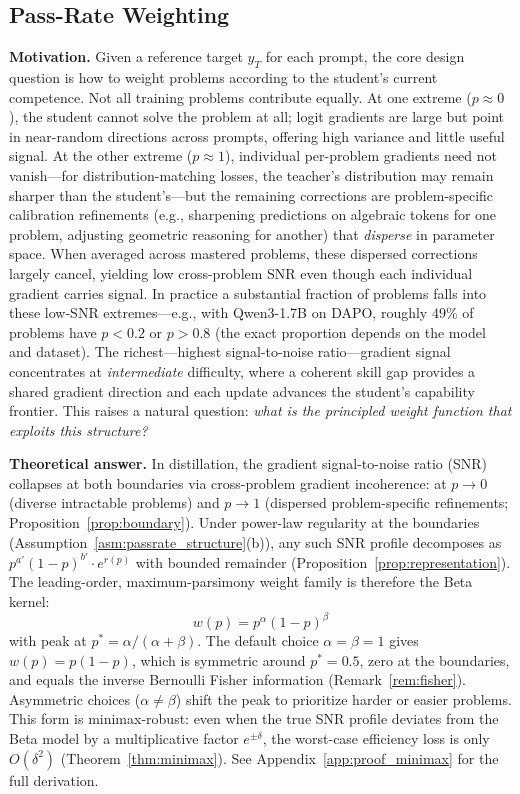 \documentclass{article}
\begin{document}
\subsection{Pass-Rate Weighting}
\label{sec:filtering}

\textbf{Motivation.} Given a reference target $y_T$ for each prompt, the core design question is how to weight problems according to the student's current competence. Not all training problems contribute equally. At one extreme ($p \approx 0$), the student cannot solve the problem at all; logit gradients are large but point in near-random directions across prompts, offering high variance and little useful signal. At the other extreme ($p \approx 1$), individual per-problem gradients need not vanish---for distribution-matching losses, the teacher's distribution may remain sharper than the student's---but the remaining corrections are problem-specific calibration refinements (e.g., sharpening predictions on algebraic tokens for one problem, adjusting geometric reasoning for another) that \emph{disperse} in parameter space. When averaged across mastered problems, these dispersed corrections largely cancel, yielding low cross-problem SNR even though each individual gradient carries signal. In practice a substantial fraction of problems falls into these low-SNR extremes---e.g., with Qwen3-1.7B on DAPO, roughly $49\%$ of problems have $p < 0.2$ or $p > 0.8$ (the exact proportion depends on the model and dataset). The richest---highest signal-to-noise ratio---gradient signal concentrates at \emph{intermediate} difficulty, where a coherent skill gap provides a shared gradient direction and each update advances the student's capability frontier. This raises a natural question: \emph{what is the principled weight function that exploits this structure?}

\textbf{Theoretical answer.} In distillation, the gradient signal-to-noise ratio (SNR) collapses at both boundaries via cross-problem gradient incoherence: at $p \to 0$ (diverse intractable problems) and $p \to 1$ (dispersed problem-specific refinements; Proposition~\ref{prop:boundary}). Under power-law regularity at the boundaries (Assumption~\ref{asm:passrate_structure}(b)), any such SNR profile decomposes as $p^{a'}(1-p)^{b'} \cdot e^{r(p)}$ with bounded remainder (Proposition~\ref{prop:representation}). The leading-order, maximum-parsimony weight family is therefore the Beta kernel:
\begin{equation}
  \boxed{w(p) = p^{\alpha}(1-p)^{\beta}}
  \label{eq:beta_kernel}
\end{equation}
with peak at $p^* = \alpha/(\alpha + \beta)$. The default choice $\alpha = \beta = 1$ gives $w(p) = p(1-p)$, which is symmetric around $p^* = 0.5$, zero at the boundaries, and equals the inverse Bernoulli Fisher information (Remark~\ref{rem:fisher}). Asymmetric choices ($\alpha \neq \beta$) shift the peak to prioritize harder or easier problems. This form is minimax-robust: even when the true SNR profile deviates from the Beta model by a multiplicative factor $e^{\pm\delta}$, the worst-case efficiency loss is only $O(\delta^2)$ (Theorem~\ref{thm:minimax}). See Appendix~\ref{app:proof_minimax} for the full derivation.
\end{document}
